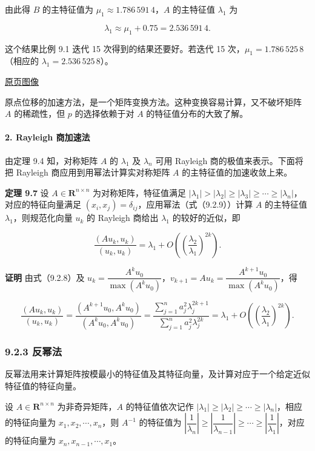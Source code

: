 \documentclass[
  10pt,
  fontset=fandol]{ctexart}
\begin{document}
由此得 \(B\) 的主特征值为 \(\mu_1\approx1.786\,591\,4\)，\(A\) 的主特征值 \(\lambda_1\) 为

\[
\lambda_1\approx\mu_1+0.75=2.536\,591\,4.
\]

这个结果比例 9.1 迭代 15 次得到的结果还要好。若迭代 15 次，\(\mu_1=1.786\,525\,8\)（相应的 \(\lambda_1=2.536\,525\,8\)）。

\href{../../source-images/pdf-240.jpeg}{原页图像}

原点位移的加速方法，是一个矩阵变换方法。这种变换容易计算，又不破坏矩阵 \(A\) 的稀疏性，但 \(p\) 的选择依赖于对 \(A\) 的特征值分布的大致了解。

\paragraph{2. Rayleigh 商加速法}\label{rayleigh-ux5546ux52a0ux901fux6cd5}

由定理 9.4 知，对称矩阵 \(A\) 的 \(\lambda_1\) 及 \(\lambda_n\) 可用 Rayleigh 商的极值来表示。下面将把 Rayleigh 商应用到用幂法计算实对称矩阵 \(A\) 的主特征值的加速收敛上来。

\textbf{定理 9.7} 设 \(A\in\mathbf R^{n\times n}\) 为对称矩阵，特征值满足 \(|\lambda_1|>|\lambda_2|\geq|\lambda_3|\geq\cdots\geq|\lambda_n|\)，对应的特征向量满足 \((x_i,x_j)=\delta_{ij}\)，应用幂法（式（9.2.9））计算 \(A\) 的主特征值 \(\lambda_1\)，则规范化向量 \(u_k\) 的 Rayleigh 商给出 \(\lambda_1\) 的较好的近似，即

\[
\frac{(Au_k,u_k)}{(u_k,u_k)}=\lambda_1+O\left(\left(\frac{\lambda_2}{\lambda_1}\right)^{2k}\right).
\]

\textbf{证明} 由式（9.2.8）及 \(u_k=\dfrac{A^ku_0}{\max(A^ku_0)}\)，\(v_{k+1}=Au_k=\dfrac{A^{k+1}u_0}{\max(A^ku_0)}\)，得

\[
\frac{(Au_k,u_k)}{(u_k,u_k)}=\frac{(A^{k+1}u_0,A^ku_0)}{(A^ku_0,A^ku_0)}=\frac{\displaystyle\sum_{j=1}^na_j^2\lambda_j^{2k+1}}{\displaystyle\sum_{j=1}^na_j^2\lambda_j^{2k}}=\lambda_1+O\left(\left(\frac{\lambda_2}{\lambda_1}\right)^{2k}\right).
\tag{9.2.11}
\]

\subsubsection{9.2.3 反幂法}\label{ux53cdux5e42ux6cd5}

反幂法用来计算矩阵按模最小的特征值及其特征向量，及计算对应于一个给定近似特征值的特征向量。

设 \(A\in\mathbf R^{n\times n}\) 为非奇异矩阵，\(A\) 的特征值依次记作 \(|\lambda_1|\geq|\lambda_2|\geq\cdots\geq|\lambda_n|\)，相应的特征向量为 \(x_1,x_2,\cdots,x_n\)，则 \(A^{-1}\) 的特征值为 \(\left|\dfrac1{\lambda_n}\right|\geq\left|\dfrac1{\lambda_{n-1}}\right|\geq\cdots\geq\left|\dfrac1{\lambda_1}\right|\)，对应的特征向量为 \(x_n,x_{n-1},\cdots,x_1\)。
\end{document}
